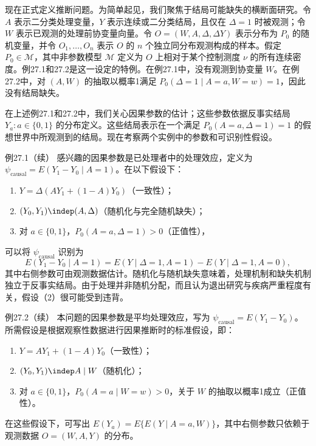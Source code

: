 现在正式定义推断问题。为简单起见，我们聚焦于结局可能缺失的横断面研究。令 $A$ 表示二分类处理变量，$Y$ 表示连续或二分类结局，且仅在 $\Delta=1$ 时被观测；令 $W$ 表示已观测的处理前协变量向量。令 $O=(W,A,\Delta,\Delta Y)$ 表示分布为 $P_0$ 的随机变量，并令 $O_1,\ldots,O_n$ 表示 $O$ 的 $n$ 个独立同分布观测构成的样本。假定 $P_0\in\mathcal M$，其中非参数模型 $\mathcal M$ 定义为 $O$ 上相对于某个控制测度 $\nu$ 的所有连续密度。例27.1和27.2是这一设定的特例。在例27.1中，没有观测到协变量 $W$。在例27.2中，对 $(A,W)$ 的抽取以概率1满足 $P_0(\Delta=1\mid A=a,W=w)=1$，因此没有结局缺失。

在上述例27.1和27.2中，我们关心因果参数的估计；这些参数依据反事实结局 $Y_a:a\in\{0,1\}$ 的分布定义。这些结局表示在一个满足 $P_0(A=a,\Delta=1)=1$ 的假想世界中所观测到的结局。现在考察两个实例中的参数和可识别性假设。

\begin{bookresult}{例}{27.1（续）}
感兴趣的因果参数是已处理者中的处理效应，定义为 $\psi_{\mathrm{causal}}=E(Y_1-Y_0\mid A=1)$。在以下假设下：
\begin{enumerate}
\item $Y=\Delta(AY_1+(1-A)Y_0)$（一致性）；
\item $(Y_0,Y_1)\indep(A,\Delta)$（随机化与完全随机缺失）；
\item 对 $a\in\{0,1\}$，$P_0(A=a,\Delta=1)>0$（正值性），
\end{enumerate}
可以将 $\psi_{\mathrm{causal}}$ 识别为
\begin{equation}
 E(Y_1-Y_0\mid A=1)=E(Y\mid\Delta=1,A=1)-E(Y\mid\Delta=1,A=0),
 \tag{27.1}
\end{equation}
其中右侧参数可由观测数据估计。随机化与随机缺失意味着，处理机制和缺失机制独立于反事实结局。由于处理并非随机分配，而且认为退出研究与疾病严重程度有关，假设（2）很可能受到违背。
\end{bookresult}

\begin{bookresult}{例}{27.2（续）}
本问题的因果参数是平均处理效应，写为 $\psi_{\mathrm{causal}}=E(Y_1-Y_0)$。所需假设是根据观察性数据进行因果推断时的标准假设，即：
\begin{enumerate}
\item $Y=AY_1+(1-A)Y_0$（一致性）；
\item $(Y_0,Y_1)\indep A\mid W$（随机化）；
\item 对 $a\in\{0,1\}$，$P_0(A=a\mid W=w)>0$，关于 $W$ 的抽取以概率1成立（正值性）。
\end{enumerate}
在这些假设下，可写出 $E(Y_a)=E\{E(Y\mid A=a,W)\}$，其中右侧参数只依赖于观测数据 $O=(W,A,Y)$ 的分布。
\end{bookresult}
